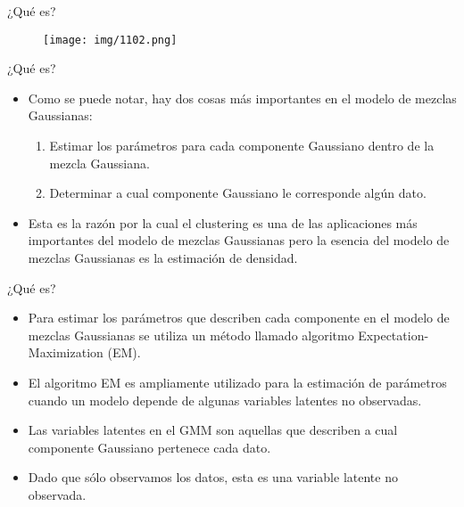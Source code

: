 \documentclass[11pt,aspectratio=169]{beamer}
\begin{document}
\begin{frame}{¿Qué es?}
\begin{figure}[H]
	\centering
	\texttt{[image: img/1102.png]}
\end{figure}
\end{frame}

\begin{frame}{¿Qué es?}
\begin{itemize}
	\item Como se puede notar, hay dos cosas más importantes en el modelo de mezclas Gaussianas:\pause
		\begin{enumerate}
			\item Estimar los parámetros para cada componente Gaussiano dentro de la mezcla Gaussiana.\pause
			\item Determinar a cual componente Gaussiano le corresponde algún dato.\pause
		\end{enumerate}
	\item Esta es la razón por la cual el clustering es una de las aplicaciones más importantes del modelo de mezclas Gaussianas pero la esencia 
		del modelo de mezclas Gaussianas es la estimación de densidad.
\end{itemize}
\end{frame}

\begin{frame}{¿Qué es?}
\begin{itemize}
	\item Para estimar los parámetros que describen cada componente en el modelo de mezclas Gaussianas se utiliza un método llamado algoritmo 
		Expectation-Maximization (EM).\pause
	\item El algoritmo EM es ampliamente utilizado para la estimación de parámetros cuando un modelo depende de algunas variables latentes no 
		observadas.\pause
	\item Las variables latentes en el GMM son aquellas que describen a cual componente Gaussiano pertenece cada dato.\pause
	\item Dado que sólo observamos los datos, esta es una variable latente no observada.
\end{itemize}
\end{frame}
\end{document}
